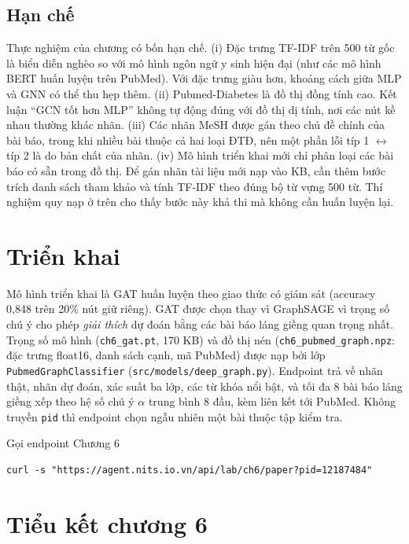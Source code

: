 \subsection{Hạn chế}

Thực nghiệm của chương có bốn hạn chế. (i) Đặc trưng TF-IDF trên 500 từ gốc là biểu diễn nghèo so với mô hình ngôn ngữ y sinh hiện đại (như các mô hình BERT huấn luyện trên PubMed). Với đặc trưng giàu hơn, khoảng cách giữa MLP và GNN có thể thu hẹp thêm. (ii) Pubmed-Diabetes là đồ thị đồng tính cao. Kết luận ``GCN tốt hơn MLP'' không tự động đúng với đồ thị dị tính, nơi các nút kề nhau thường khác nhãn. (iii) Các nhãn MeSH được gán theo chủ đề chính của bài báo, trong khi nhiều bài thuộc cả hai loại ĐTĐ, nên một phần lỗi típ 1 $\leftrightarrow$ típ 2 là do bản chất của nhãn. (iv) Mô hình triển khai mới chỉ phân loại các bài báo có sẵn trong đồ thị. Để gán nhãn tài liệu mới nạp vào KB, cần thêm bước trích danh sách tham khảo và tính TF-IDF theo đúng bộ từ vựng 500 từ. Thí nghiệm quy nạp ở trên cho thấy bước này khả thi mà không cần huấn luyện lại.

\section{Triển khai}

Mô hình triển khai là GAT huấn luyện theo giao thức có giám sát (accuracy 0,848 trên 20\% nút giữ riêng). GAT được chọn thay vì GraphSAGE vì trọng số chú ý cho phép \emph{giải thích} dự đoán bằng các bài báo láng giềng quan trọng nhất. Trọng số mô hình (\texttt{ch6\_gat.pt}, 170 KB) và đồ thị nén (\texttt{ch6\_pubmed\_graph.npz}: đặc trưng float16, danh sách cạnh, mã PubMed) được nạp bởi lớp \texttt{PubmedGraphClassifier} (\texttt{src/models/deep\_graph.py}). Endpoint  trả về nhãn thật, nhãn dự đoán, xác suất ba lớp, các từ khóa nổi bật, và tối đa 8 bài báo láng giềng xếp theo hệ số chú ý $\alpha$ trung bình 8 đầu, kèm liên kết tới PubMed. Không truyền \texttt{pid} thì endpoint chọn ngẫu nhiên một bài thuộc tập kiểm tra.

\begin{code}{Gọi endpoint Chương 6}
\label{lst:ch6-api}
\begin{verbatim}
curl -s "https://agent.nits.io.vn/api/lab/ch6/paper?pid=12187484"
\end{verbatim}
\end{code}

\section{Tiểu kết chương 6}

